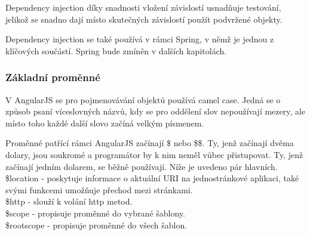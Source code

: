 \documentclass[czech,master,public,dept460,male,cpdeclaration,twoside]{diploma}
\begin{document}
Dependency injection díky snadnosti vložení závislostí usnadňuje testování, jelikož se snadno dají místo skutečných závislostí použít podvržené objekty.

Dependency injection se také používá v rámci Spring, v němž je jednou z klíčových součástí. Spring bude zmíněn v dalších kapitolách. \cite{LearningAngularjs}

\subsubsection{Základní proměnné}
V AngularJS se pro pojmenovávání objektů používá camel case. Jedná se o způsob psaní víceslovných názvů, kdy se pro oddělení slov nepoužívají mezery, ale místo toho každé další slovo začíná velkým písmenem.

Proměnné patřící rámci AngularJS začínají \$ nebo \$\$. Ty, jenž začínají dvěma dolary, jsou soukromé a programátor by k nim neměl vůbec přistupovat. Ty, jenž začínají jedním dolarem, se běžně používají. Níže je uvedeno pár hlavních.\\
\$location - poskytuje informace o aktuální URI na jednostránkové aplikaci, také svými funkcemi umožňuje přechod mezi stránkami.\\
\$http - slouží k volání http metod.\\
\$scope - propisuje proměnné do vybrané šablony.\\
\$rootscope - propisuje proměnné do všech šablon.
\end{document}
